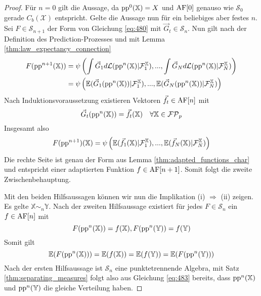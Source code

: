 \begin{proof}
        Für $n=0$ gilt die Aussage, da $\operatorname{pp}^0(\mathbb{X})=X$ und $\operatorname{AF}[0]$ genauso wie $\mathcal{S}_0$ gerade $C_b(\mathcal{X})$ entspricht. Gelte die Aussage nun für ein beliebiges aber festes $n$. Sei $F \in \mathcal{S}_{n+1}$ der Form von Gleichung \ref{eq:480} mit $\vec{G}_t \in \mathcal{S}_n$. Nun gilt nach der Definition des Prediction-Prozesses und mit Lemma \ref{thm:law_expectancy_connection}
        \begin{align*}
        F(\operatorname{pp}^{n+1}(\mathbb{X})) &= \psi\left( \int \vec{G}_1d\mathcal{L}(\operatorname{pp}^n(\mathbb{X}) \vert \mathcal{F}_1^\mathbb{X}), ..., \int \vec{G}_N d\mathcal{L}(\operatorname{pp}^n(\mathbb{X}) \vert \mathcal{F}_N^\mathbb{X})\right) \\
        &= \psi\left( \mathbb{E}(\vec{G}_1(\operatorname{pp}^n(\mathbb{X})) \vert \mathcal{F}_1^\mathbb{X}), ..., \mathbb{E}(\vec{G}_N(\operatorname{pp}^n(\mathbb{X})) \vert \mathcal{F}_N^\mathbb{X})\right) 
        \end{align*}
        Nach Induktionsvoraussetzung existieren Vektoren $\vec{f}_t \in \operatorname{AF}[n]$ mit 
        $$\vec{G}_t(\operatorname{pp}^n(\mathbb{X})) = \vec{f}_t(\mathbb{X}) \quad \forall \mathbb{X} \in \mathcal{FP}_p$$
        Insgesamt also
        $$F(\operatorname{pp}^{n+1})(\mathbb{X}) = \psi\left(\mathbb{E}(\vec{f}_1(\mathbb{X}) \vert \mathcal{F}_1^\mathbb{X}), ..., \mathbb{E}(\vec{f}_N(\mathbb{X}) \vert \mathcal{F}_N^\mathbb{X})\right)$$
        Die rechte Seite ist genau der Form aus Lemma \ref{thm:adapted_functions_char} und entspricht einer adaptierten Funktion $f\in\operatorname{AF}[n+1]$. Somit folgt die zweite Zwischenbehauptung.

        Mit den beiden Hilfsaussagen können wir nun die Implikation (i) $\Rightarrow$ (ii) zeigen. Es gelte $\mathbb{X} \sim_n \mathbb{Y}$. Nach der zweiten Hilfsaussage existiert für jedes $F \in \mathcal{S}_n$ ein $f \in \operatorname{AF}[n]$ mit 
        $$F(\operatorname{pp}^n(\mathbb{X})) = f(\mathbb{X}), F(\operatorname{pp}^n(\mathbb{Y})) = f(\mathbb{Y})$$
        Somit gilt 
        \begin{equation}\label{eq:483}
            \mathbb{E}(F(\operatorname{pp}^n(\mathbb{X}))) = \mathbb{E}(f(\mathbb{X})) = \mathbb{E}(f(\mathbb{Y})) = \mathbb{E}(F(\operatorname{pp}^n(\mathbb{Y})))
        \end{equation}
        Nach der ersten Hilfsaussage ist $\mathcal{S}_n$ eine punktetrennende Algebra, mit Satz \ref{thm:separating_measures} folgt also aus Gleichung \ref{eq:483} bereits, dass $\operatorname{pp}^n(\mathbb{X})$ und $\operatorname{pp}^n(\mathbb{Y})$ die gleiche Verteilung haben.
    \end{proof}

